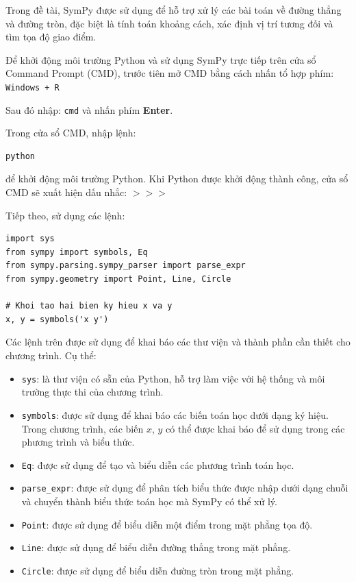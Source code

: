 \documentclass[12pt,a4paper]{article}
\begin{document}
Trong đề tài, SymPy được sử dụng để hỗ trợ xử lý các bài toán về đường thẳng và đường tròn, đặc biệt là tính toán khoảng cách, xác định vị trí tương đối và tìm tọa độ giao điểm.

Để khởi động môi trường Python và sử dụng SymPy trực tiếp trên cửa sổ Command Prompt (CMD), trước tiên mở CMD bằng cách nhấn tổ hợp phím: \texttt{Windows + R}

Sau đó nhập: \texttt{cmd} và nhấn phím \textbf{Enter}.

Trong cửa sổ CMD, nhập lệnh: 
\begin{lstlisting}
python
\end{lstlisting}
để khởi động môi trường Python. Khi Python được khởi động thành công, cửa sổ CMD sẽ xuất hiện dấu nhắc: \(\mathtt{>>>}\)

Tiếp theo, sử dụng các lệnh:

\begin{lstlisting}
import sys
from sympy import symbols, Eq
from sympy.parsing.sympy_parser import parse_expr
from sympy.geometry import Point, Line, Circle

# Khoi tao hai bien ky hieu x va y
x, y = symbols('x y')
\end{lstlisting}

Các lệnh trên được sử dụng để khai báo các thư viện và thành phần cần thiết cho chương trình. Cụ thể:

\begin{itemize}
    \item \texttt{sys}: là thư viện có sẵn của Python, hỗ trợ làm việc với hệ thống và môi trường thực thi của chương trình.
    
    \item \texttt{symbols}: được sử dụng để khai báo các biến toán học dưới dạng ký hiệu. Trong chương trình, các biến $x$, $y$ có thể được khai báo để sử dụng trong các phương trình và biểu thức.
    
    \item \texttt{Eq}: được sử dụng để tạo và biểu diễn các phương trình toán học.
    
    \item \texttt{parse\_expr}: được sử dụng để phân tích biểu thức được nhập dưới dạng chuỗi và chuyển thành biểu thức toán học mà SymPy có thể xử lý.
    
    \item \texttt{Point}: được sử dụng để biểu diễn một điểm trong mặt phẳng tọa độ.
    
    \item \texttt{Line}: được sử dụng để biểu diễn đường thẳng trong mặt phẳng.
    
    \item \texttt{Circle}: được sử dụng để biểu diễn đường tròn trong mặt phẳng.
\end{itemize}
\end{document}
